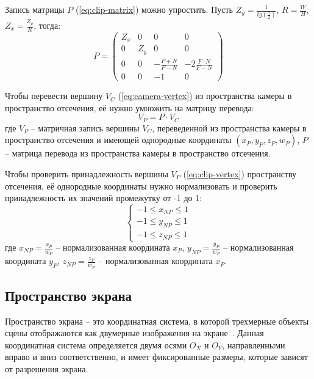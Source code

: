 Запись матрицы $P$ (\ref{eq:clip-matrix}) можно упростить. Пусть $Z_y = \frac{1}{tg(\frac{\gamma}{2})}$, $R = \frac{W}{H}$, $Z_x = \frac{Z_y}{R}$, тогда:
\begin{equation}
	P = 
	\begin{pmatrix}
		Z_x & 0 & 0 & 0 \\
		0 & Z_y & 0 & 0 \\
		0 & 0 & -\frac{F + N}{F - N} & -2\frac{F \cdot N}{F - N} \\
		0 & 0 & -1 & 0 
	\end{pmatrix}
\end{equation}

Чтобы перевести вершину $V_C$ (\ref{eq:camera-vertex}) из пространства камеры в пространство отсечения, её нужно умножить на матрицу перевода:
\begin{equation}
	V_P = P \cdot V_C
	\label{eq:clip-vertex}
\end{equation}
где $V_P$ -- матричная запись вершины $V_C$, переведенной из пространства камеры в пространство отсечения и имеющей однородные координаты $(x_P, y_P, z_P, w_P)$, $P$ -- матрица перевода из пространства камеры в пространство отсечения.

Чтобы проверить принадлежность вершины $V_P$ (\ref{eq:clip-vertex}) пространству отсечения, её однородные координаты нужно нормализовать и проверить принадлежность их значений промежутку от -1 до 1:
\begin{equation}
	\begin{cases}
		-1 \le x_{NP} \le 1 \\
		-1 \le y_{NP}\le 1 \\
		-1 \le z_{NP} \le 1
	\end{cases}
\end{equation}
где $x_{NP} = \frac{x_P}{w_P}$ -- нормализованная координата $x_P$, $y_{NP} = \frac{y_P}{w_P}$ -- нормализованная координата $y_P$, $z_{NP} = \frac{z_P}{w_P}$ -- нормализованная координата $x_P$.

\subsection{Пространство экрана}

Пространство экрана -- это координатная система, в которой трехмерные объекты сцены отображаются как двумерные изображения на экране~\cite{lit13, lit14}. Данная координатная система определяется двумя осями $O_X$ и $O_Y$, направленными вправо и вниз соответственно, и имеет фиксированные размеры, которые зависят от разрешения экрана.

